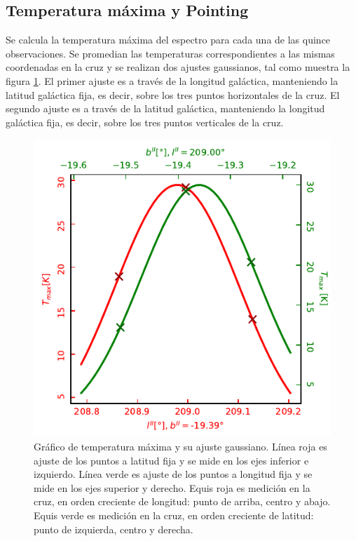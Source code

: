 \subsection{Temperatura máxima y Pointing}

Se calcula la temperatura máxima del espectro para cada una de las quince observaciones. Se promedian las temperaturas correspondientes a las mismas coordenadas en la cruz y se realizan dos ajustes gaussianos, tal como muestra la figura \ref{fig:tmax}. El primer ajuste es a través de la longitud galáctica, manteniendo la latitud galáctica fija, es decir, sobre los tres puntos horizontales de la cruz. El segundo ajuste es a través de la latitud galáctica, manteniendo la longitud galáctica fija, es decir, sobre los tres puntos verticales de la cruz.

\begin{figure}[p]
	\centering
	\includegraphics{rsc/tmax.pdf}
	\caption{Gráfico de temperatura máxima y su ajuste gaussiano. Línea roja es ajuste de los puntos a latitud fija y se mide en los ejes inferior e izquierdo. Línea verde es ajuste de los puntos a longitud fija y se mide en los ejes superior y derecho. Equis roja es medición en la cruz, en orden creciente de longitud: punto de arriba, centro y abajo. Equis verde es medición en la cruz, en orden creciente de latitud: punto de izquierda, centro y derecha.}
	\label{fig:tmax}
\end{figure}

